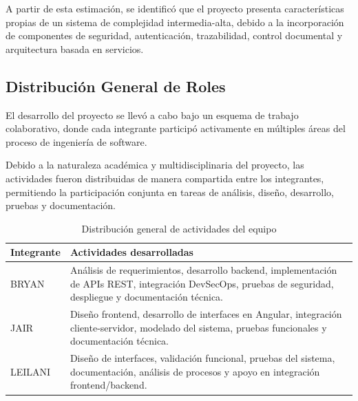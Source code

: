 \documentclass[12pt,oneside,letterpaper]{book}
\begin{document}
\vspace{0.3cm}

A partir de esta estimación, se identificó que el proyecto presenta características propias de un sistema de complejidad intermedia-alta, debido a la incorporación de componentes de seguridad, autenticación, trazabilidad, control documental y arquitectura basada en servicios.

\vspace{0.5cm}

\subsection{Distribución General de Roles}

El desarrollo del proyecto se llevó a cabo bajo un esquema de trabajo colaborativo, donde cada integrante participó activamente en múltiples áreas del proceso de ingeniería de software.

Debido a la naturaleza académica y multidisciplinaria del proyecto, las actividades fueron distribuidas de manera compartida entre los integrantes, permitiendo la participación conjunta en tareas de análisis, diseño, desarrollo, pruebas y documentación.

\begin{table}[H]
\centering
\caption{Distribución general de actividades del equipo}

\begin{tabular}{p{3cm} p{10cm}}
\toprule
\rowcolor{headerblue}
\textbf{Integrante} & \textbf{Actividades desarrolladas} \\
\midrule

BRYAN &
Análisis de requerimientos, desarrollo backend, implementación de APIs REST, integración DevSecOps, pruebas de seguridad, despliegue y documentación técnica. \\

JAIR &
Diseño frontend, desarrollo de interfaces en Angular, integración cliente-servidor, modelado del sistema, pruebas funcionales y documentación técnica. \\

LEILANI &
Diseño de interfaces, validación funcional, pruebas del sistema, documentación, análisis de procesos y apoyo en integración frontend/backend. \\

\bottomrule
\end{tabular}
\end{table}
\end{document}
